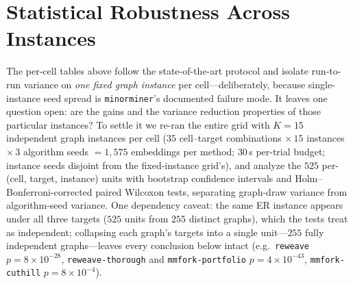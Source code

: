 \documentclass[acmsmall,anonymous,nonacm]{acmart}
\begin{document}
\section{Statistical Robustness Across Instances}
\label{sec:rigor}

The per-cell tables above follow the state-of-the-art protocol and isolate run-to-run
variance on \emph{one fixed graph instance} per cell---deliberately, because
single-instance seed spread is \texttt{minorminer}'s documented failure mode. It
leaves one question open: are the gains and the variance reduction properties of those
particular instances? To settle it we re-ran the entire grid with $K=15$ independent
graph instances per cell ($35$ cell--target combinations $\times\,15$ instances
$\times\,3$ algorithm seeds $=1{,}575$ embeddings per method; $30$\,s per-trial
budget; instance seeds disjoint from the fixed-instance grid's), and analyze the
$525$ per-(cell, target, instance) units with bootstrap confidence intervals and
Holm--Bonferroni-corrected paired Wilcoxon tests, separating graph-draw variance from
algorithm-seed variance. One dependency caveat: the same ER instance appears under
all three targets ($525$ units from $255$ distinct graphs), which the tests treat as
independent; collapsing each graph's targets into a single unit---$255$ fully
independent graphs---leaves every conclusion below intact
(e.g.\ \texttt{reweave} $p=8{\times}10^{-28}$, \texttt{reweave-thorough} and
\texttt{mmfork-portfolio} $p=4{\times}10^{-43}$, \texttt{mmfork-cuthill}
$p=8{\times}10^{-4}$).
\end{document}
